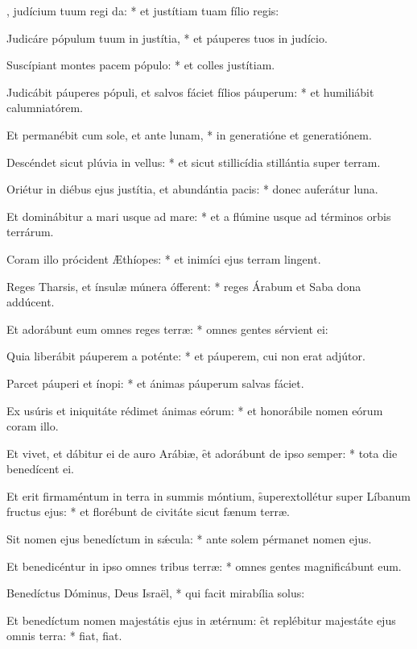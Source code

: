 \begin{psalmus}

    , judícium tuum regi da: * et justítiam tuam fílio regis:

    Judicáre pópulum tuum in justítia, * et páuperes tuos in judício.

    Suscípiant montes pacem pópulo: * et colles justítiam.

    Judicábit páuperes pópuli, et salvos fáciet fílios páuperum: * et humiliábit calumniatórem.

    Et permanébit cum sole, et ante lunam, * in generatióne et generatiónem.

    Descéndet sicut plúvia in vellus: * et sicut stillicídia stillántia super terram.

    Oriétur in diébus ejus justítia, et abundántia pacis: * donec auferátur luna.

    Et dominábitur a mari usque ad mare: * et a flúmine usque ad términos orbis terrárum.

    Coram illo prócident Æthíopes: * et inimíci ejus terram lingent.

    Reges Tharsis, et ínsulæ múnera ófferent: * reges Árabum et Saba dona addúcent.

    Et adorábunt eum omnes reges terræ: * omnes gentes sérvient ei:

    Quia liberábit páuperem a poténte: * et páuperem, cui non erat adjútor.

    Parcet páuperi et ínopi: * et ánimas páuperum salvas fáciet.

    Ex usúris et iniquitáte rédimet ánimas eórum: * et honorábile nomen eórum coram illo.

    Et vivet, et dábitur ei de auro Arábiæ, \f et adorábunt de ipso semper: * tota die benedícent ei.

    Et erit firmaméntum in terra in summis móntium, \f superextollétur super Líbanum fructus ejus: * et florébunt de civitáte sicut fænum terræ.

    Sit nomen ejus benedíctum in sǽcula: * ante solem pérmanet nomen ejus.

    Et benedicéntur in ipso omnes tribus terræ: * omnes gentes magnificábunt eum.

    Benedíctus Dóminus, Deus Israël, * qui facit mirabília solus:

    Et benedíctum nomen majestátis ejus in ætérnum: \f et replébitur majestáte ejus omnis terra: * fiat, fiat.

\end{psalmus}
